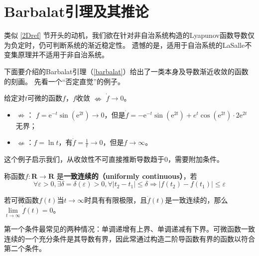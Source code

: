 \section{Barbalat引理及其推论}\label{3Eref}
类似 \ref{2Dref} 节开头的动机，我们欲在针对非自治系统构造的Lyapunov函数导数仅为负定时，仍可判断系统的渐近稳定性。
遗憾的是，适用于自治系统的LaSalle不变集原理并不适用于非自治系统。

下面要介绍的Barbalat引理（\ref{barbalat}）给出了一类本身及导数渐近收敛的函数的刻画。
先看一个“否定直觉”的例子。
\begin{example}
    给定对$t$可微的函数$f$，$f$收敛  $\nLeftrightarrow $ $\dot{f} \rightarrow 0$。
  \begin{itemize}[leftmargin=1em]
    \item $\nRightarrow $： $f = \mathrm{e}^{- t} \sin (\mathrm{e}^{2 t}) \rightarrow 0$，但是$ \dot{f} = - \mathrm{e}^{- t} \sin
    (\mathrm{e}^{2 t}) + e^t \cos (\mathrm{e}^{2 t}) \cdot 2 \mathrm{e}^{2 t}$ 无界；    
    \item $\nLeftarrow $：$f = \ln  t$，有$ \dot{f} = \frac{1}{t} \rightarrow0$，但是$f \rightarrow \infty$。
  \end{itemize}
\end{example}
这个例子启示我们，从收敛性不可直接推断导数趋于$0$，需要附加条件。
\begin{definition}
    称函数$f : \mathbf{R} \rightarrow \mathbf{R}$ 是{\bf 一致连续的（uniformly continuous）}，若
     \[\forall \varepsilon > 0, \exists \delta
  = \delta (\varepsilon) > 0, \forall | t_2 - t_1 | \leq \delta \Rightarrow |
  f (t_2) - f (t_1) | \leq \varepsilon\]
\end{definition}
\begin{theorem}[Barbalat引理]\label{barbalat}
    若可微函数$f(t)$当$t\to\infty$时具有有限极限，且$\dot{f}(t)$是一致连续的，那么$\lim\limits_{t\to\infty}\dot{f}(t)=0$。
\end{theorem}
\begin{note}
  第一个条件最常见的两种情况：单调递增有上界、单调递减有下界。可微函数一致连续的一个充分条件是其导数有界，因此常通过构造二阶导函数有界的函数以符合第二个条件。
\end{note}
